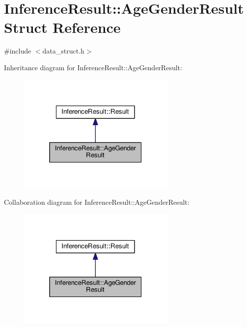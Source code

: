 \hypertarget{structInferenceResult_1_1AgeGenderResult}{}\section{Inference\+Result\+:\+:Age\+Gender\+Result Struct Reference}
\label{structInferenceResult_1_1AgeGenderResult}


{\ttfamily \#include $<$data\+\_\+struct.\+h$>$}



Inheritance diagram for Inference\+Result\+:\+:Age\+Gender\+Result\+:
\nopagebreak
\begin{figure}[H]
\begin{center}
\leavevmode
\includegraphics[width=220pt]{structInferenceResult_1_1AgeGenderResult__inherit__graph}
\end{center}
\end{figure}


Collaboration diagram for Inference\+Result\+:\+:Age\+Gender\+Result\+:
\nopagebreak
\begin{figure}[H]
\begin{center}
\leavevmode
\includegraphics[width=220pt]{structInferenceResult_1_1AgeGenderResult__coll__graph}
\end{center}
\end{figure}
